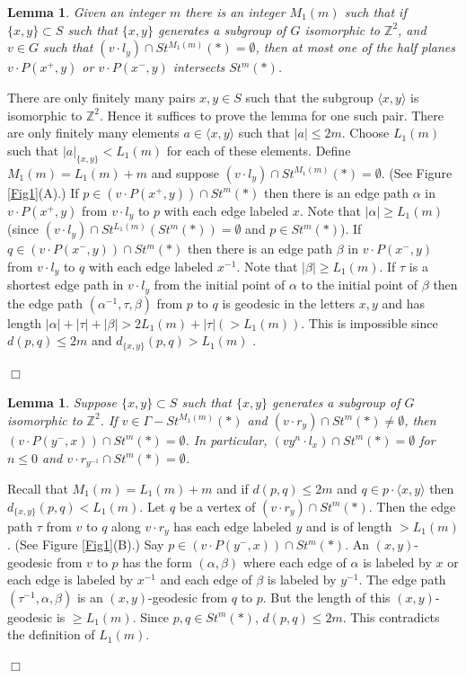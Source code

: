 \documentclass[12pt]{article}
\newtheorem{lemma}[theorem]{Lemma}
\newenvironment{proof}{\addvspace{12pt}\noindent{\bf Proof:}}{
$\Box$\par\addvspace{12pt}}
\numberwithin{equation}{section}
\begin{document}
\begin{lemma}\label{L1}
Given an integer $m$ there is an integer $M_1(m)$ such that if $\{x,y\}\subset S$ such that $\{x,y\}$ generates a subgroup of $G$ isomorphic to $\mathbb Z^2$, and  $v\in G$ such that $(v\cdot l_y)\cap St^{M_1(m)}(\ast)=\emptyset$, then at most one of the half planes $v\cdot P(x^+,y)$ or $v\cdot P(x^-,y)$ intersects $St^m(\ast)$. 
\end{lemma}
\begin{proof} 
There are only finitely many pairs $x,y\in S$ such that the subgroup $\langle x,y\rangle$ is isomorphic to $\mathbb Z^2$. Hence it suffices to prove the lemma for one such pair. There are only finitely many elements  $a\in \langle x,y\rangle$ such that $|a|\leq 2m$. Choose $L_1(m)$ such that $|a|_{\{x,y\}}< L_1(m)$ for each of these elements. Define $M_1(m)=L_1(m)+m$ and suppose $(v\cdot l_y)\cap St^{M_1(m)}(\ast)=\emptyset$. (See Figure \ref{Fig1}(A).) If $p\in (v\cdot P(x^+,y))\cap St^m(\ast)$ then there is an edge path $\alpha$ in $v\cdot P(x^+,y)$ from $v\cdot l_y$ to $p$ with each edge labeled $x$. Note that $|\alpha |\geq L_1(m)$ (since $(v\cdot l_y)\cap St^{L_1(m)}(St^m(\ast))=\emptyset $ and $p\in St^m(\ast)$).  If $q\in (v\cdot P(x^-,y))\cap St^m(\ast)$ then there is an edge path $\beta$ in $v\cdot P(x^-,y)$ from $v\cdot l_y$ to $q$ with each edge labeled $x^{-1}$. Note that $|\beta |\geq L_1(m)$. If $\tau$ is a shortest edge path in $v\cdot l_y$ from the initial point of $\alpha$ to the initial point of $\beta$ then the edge path $(\alpha^{-1}, \tau, \beta)$  from $p$ to $q$ is geodesic in the letters $x,y$ and has length $| \alpha |+|\tau|+|\beta|>2L_1(m)+|\tau | (>L_1(m))$. This is impossible since $d(p,q)\leq 2m$ and $d_{\{x,y\}}(p,q)>L_1(m)$ . 
\end{proof}


\begin{lemma}\label{L2}
Suppose $\{x,y\}\subset S$ such that $\{x,y\}$ generates a subgroup of $G$ isomorphic to $\mathbb Z^2$. If  $v\in \Gamma-St^{M_1(m)}(\ast)$ and 
$(v\cdot r_y)\cap St^m(\ast)\ne\emptyset$, then  $(v\cdot P(y^-,x))\cap St^m(\ast)=\emptyset$. In particular, $(vy^n\cdot l_x)\cap St^m(\ast)=\emptyset$ for $n\leq 0$ and $v\cdot r_{y^{-1}}\cap St^m(\ast)=\emptyset$. 
\end{lemma}
\begin{proof} Recall that $M_1(m)=L_1(m)+m$ and if $d(p,q)\leq 2m$ and $q\in p\cdot \langle x,y\rangle$ then $d_{\{x,y\}}(p,q)< L_1(m)$. Let $q$ be a vertex of $(v\cdot r_y)\cap St^m(\ast)$. Then the edge path $\tau$ from $v$ to $q$ along $v\cdot r_y$ has each edge labeled $y$ and is of length $>L_1(m)$. (See Figure \ref{Fig1}(B).) Say $p\in (v\cdot P(y^-,x))\cap St^m(\ast)$. An $(x,y)$-geodesic from $v$ to $p$ has the form $(\alpha, \beta)$ where each edge of $\alpha$ is labeled by $x$ or each edge is labeled by $x^{-1}$ and each edge of $\beta$ is labeled by $y^{-1}$. The edge path $(\tau^{-1}, \alpha, \beta)$ is an $(x,y)$-geodesic from $q$ to $p$. But the length of this $(x,y)$-geodesic is $\geq L_1(m)$. Since $p,q\in St^m(\ast)$, $d(p,q)\leq 2m$. This contradicts the definition of $L_1(m)$. 
\end{proof}
\end{document}
